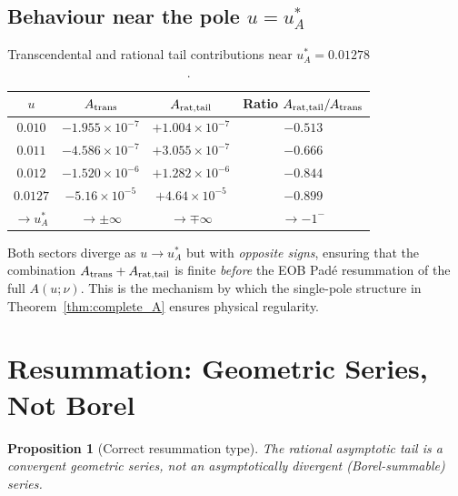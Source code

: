 \documentclass[11pt,a4paper]{article}
\theoremstyle{plain}
\newtheorem{proposition}[theorem]{Proposition}
\theoremstyle{definition}
\theoremstyle{remark}
\newcommand{\uA}{u_A^*}
\begin{document}
\subsection{Behaviour near the pole $u = \uA$}

\begin{table}[h]
\centering\small\renewcommand{\arraystretch}{1.3}
\caption{Transcendental and rational tail contributions near $\uA = 0.01278$.}
\label{tab:near_pole}
\begin{tabular}{@{}cccc@{}}
\toprule
$u$ & $A_{\rm trans}$ & $A_{\rm rat,tail}$ & Ratio $A_{\rm rat,tail}/A_{\rm trans}$ \\
\midrule
$0.010$ & $-1.955\times10^{-7}$ & $+1.004\times10^{-7}$ & $-0.513$ \\
$0.011$ & $-4.586\times10^{-7}$ & $+3.055\times10^{-7}$ & $-0.666$ \\
$0.012$ & $-1.520\times10^{-6}$ & $+1.282\times10^{-6}$ & $-0.844$ \\
$0.0127$ & $-5.16\times10^{-5}$ & $+4.64\times10^{-5}$ & $-0.899$ \\
$\to\uA$ & $\to\pm\infty$ & $\to\mp\infty$ & $\to -1^{-}$ \\
\bottomrule
\end{tabular}
\end{table}

Both sectors diverge as $u\to\uA$ but with \emph{opposite signs}, ensuring that
the combination $A_{\rm trans}+A_{\rm rat,tail}$ is finite \emph{before} the
EOB Pad\'e resummation of the full $A(u;\nu)$.  This is the mechanism by which
the single-pole structure in Theorem~\ref{thm:complete_A} ensures physical regularity.

\section{Resummation: Geometric Series, Not Borel}
\label{sec:resum}

\begin{proposition}[Correct resummation type]\label{prop:resum}
The rational asymptotic tail is a \emph{convergent geometric series}, not an
asymptotically divergent (Borel-summable) series.
\end{proposition}
\end{document}

